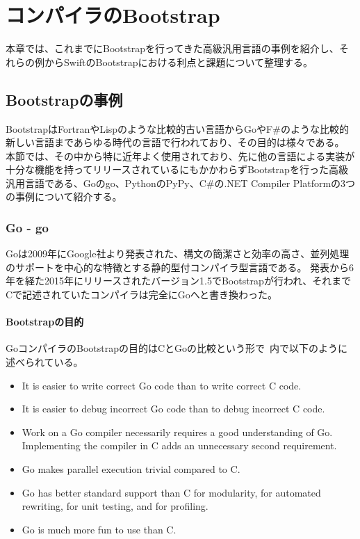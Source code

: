 \chapter{コンパイラのBootstrap}
\label{explain-bootstrap}

本章では、これまでにBootstrapを行ってきた高級汎用言語の事例を紹介し、それらの例からSwiftのBootstrapにおける利点と課題について整理する。

\section{Bootstrapの事例}
\label{explain-bootstrap:instance}

BootstrapはFortranやLispのような比較的古い言語からGoやF\#のような比較的新しい言語まであらゆる時代の言語で行われており、その目的は様々である。
本節では、その中から特に近年よく使用されており、先に他の言語による実装が十分な機能を持ってリリースされているにもかかわらずBootstrapを行った高級汎用言語である、Goのgo、PythonのPyPy、C\#の.NET Compiler Platformの3つの事例について紹介する。

\subsection{Go - go}
\label{explain-bootstrap:instance:go}

Goは2009年にGoogle社より発表された、構文の簡潔さと効率の高さ、並列処理のサポートを中心的な特徴とする静的型付コンパイラ型言語である。
発表から6年を経た2015年にリリースされたバージョン1.5でBootstrapが行われ、それまでCで記述されていたコンパイラは完全にGoへと書き換わった。

\subsubsection{Bootstrapの目的}

GoコンパイラのBootstrapの目的はCとGoの比較という形で~\cite{go-compiler-overhaul}内で以下のように述べられている。

\begin{itemize}
\item It is easier to write correct Go code than to write correct C code.
\item It is easier to debug incorrect Go code than to debug incorrect C code.
\item Work on a Go compiler necessarily requires a good understanding of Go. Implementing the compiler in C adds an unnecessary second requirement.
\item Go makes parallel execution trivial compared to C.
\item Go has better standard support than C for modularity, for automated rewriting, for unit testing, and for profiling.
\item Go is much more fun to use than C.
\end{itemize}

